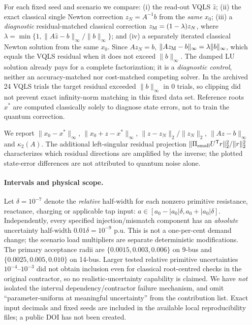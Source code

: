 \documentclass[11pt,a4paper]{article}
\theoremstyle{remark}\newtheorem{remark}[theorem]{Remark}
\begin{document}
For each fixed seed and scenario we compare: (i) the read-out VQLS $\widehat z$; (ii) the exact classical single Newton correction $z_N=A^{-1}b$ from the \emph{same} $x_0$; (iii) a \emph{diagnostic} residual-matched classical correction $z_{\rm M}=(1-\lambda)z_N$, where $\lambda=\min\{1,\|A\widehat z-b\|_\infty/\|b\|_\infty\}$; and (iv) a separately iterated classical Newton solution from the same $x_0$. Since $Az_N=b$, $\|Az_{\rm M}-b\|_\infty=\lambda\|b\|_\infty$, which equals the VQLS residual when it does not exceed $\|b\|_\infty$. The damped LU solution already pays for a complete factorization; it is a \emph{diagnostic control}, neither an accuracy-matched nor cost-matched competing solver. In the archived 24 VQLS trials the target residual exceeded $\|b\|_\infty$ in 0 trials, so clipping did not prevent exact infinity-norm matching in this fixed data set. Reference roots $x^*$ are computed classically solely to diagnose state errors, not to train the quantum correction.

We report $\|x_0-x^*\|_\infty$, $\|x_0+z-x^*\|_\infty$, $\|z-z_N\|_2/\|z_N\|_2$, $\|Az-b\|_\infty$ and $\kappa_2(A)$. The additional left-singular residual projection $\|\Pi_{\rm small}U^\mathsf Tr\|_2^2/\|r\|_2^2$ characterizes which residual directions are amplified by the inverse; the plotted state-error differences are not attributed to quantum noise alone.

\paragraph{Intervals and physical scope.} Let $\delta=10^{-7}$ denote the \emph{relative} half-width for each nonzero primitive resistance, reactance, charging or applicable tap input: $a\in[a_0-|a_0|\delta,a_0+|a_0|\delta]$. Independently, every specified injection/mismatch component has an \emph{absolute} uncertainty half-width $0.01\delta=10^{-9}$ p.u. This is not a one-per-cent demand change; the scenario load multipliers are separate deterministic modifications. The primary acceptance radii are $\{0.0015,0.003,0.006\}$ on 9-bus and $\{0.0025,0.005,0.010\}$ on 14-bus. Larger tested relative primitive uncertainties $10^{-4}$--$10^{-3}$ did not obtain inclusion even for classical root-centred checks in the original contractor, so no realistic-uncertainty capability is claimed. We have \emph{not} isolated the interval dependency/contractor failure mechanism, and omit ``parameter-uniform at meaningful uncertainty'' from the contribution list. Exact input decimals and fixed seeds are included in the available local reproducibility files; a public DOI has not been created.
\end{document}

